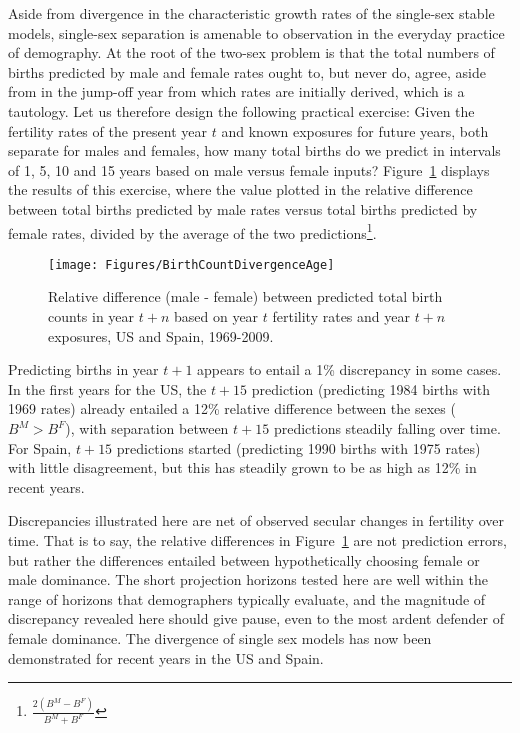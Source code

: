  \FloatBarrier
\label{sec:divbirth}
Aside from divergence in the characteristic growth rates of the single-sex
stable models, single-sex separation is amenable to observation in the everyday
practice of demography. At the root of the two-sex problem is that the total
numbers of births predicted by male and female rates ought to, but never do,
agree, aside from in the jump-off year from which rates are initially derived, 
which is a tautology. Let us therefore design the following practical exercise:
Given the fertility rates of the present year $t$ and known exposures for
future years, both separate for males and females, how many total births do we
predict in intervals of 1, 5, 10 and 15 years based on male
versus female inputs? Figure~\ref{fig:BirthCountDivergenceAge} displays the
results of this exercise, where the value plotted in the relative
difference between total births predicted by male
rates versus total births predicted by female rates, divided by
the average of the two predictions\footnote{$\frac{2(B^M - B^F)}{B^M + B^F}$}.

\begin{figure}[ht!]
        \centering  
          \caption{Relative difference (male - female) between predicted total
          birth counts in year $t+n$ based on year $t$ fertility rates and year $t+n$ exposures, US and Spain, 1969-2009.}
           \texttt{[image: Figures/BirthCountDivergenceAge]}
          \label{fig:BirthCountDivergenceAge}
\end{figure}

Predicting births in year $t+1$ appears to entail a 1\% discrepancy in some
cases. In the first years for the US, the $t+15$ prediction (predicting
1984 births with 1969 rates) already entailed a 12\% relative difference
between the sexes ($B^M > B^F$), with separation between $t+15$ predictions
steadily falling over time. For Spain, $t+15$ predictions started (predicting 1990
births with 1975 rates) with little disagreement, but this has steadily grown to be as high
as 12\% in recent years.

Discrepancies illustrated here are net of observed secular changes in
fertility over time. That is to say, the relative differences in
Figure~\ref{fig:BirthCountDivergenceAge} are not prediction errors, but rather
the differences entailed between hypothetically choosing female or male
dominance. The short projection horizons tested here are well within the range
of horizons that demographers typically evaluate, and the magnitude of
discrepancy revealed here should give pause, even to the most ardent defender
of female dominance. The divergence of single sex
models has now been demonstrated for recent years in the US and Spain.

